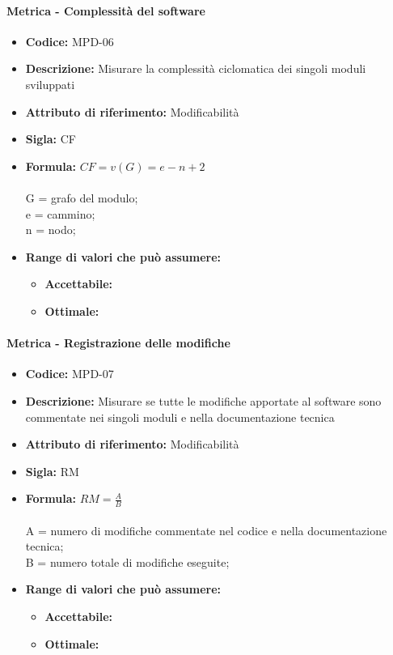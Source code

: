            \paragraph{Metrica - Complessità del software} 
              \begin{itemize}
         \item   \textbf{Codice:} MPD-06
         \item   \textbf{Descrizione:} Misurare la complessità ciclomatica dei singoli moduli sviluppati
          \item  \textbf{Attributo di riferimento:} Modificabilità
          \item  \textbf{Sigla:} CF
         \item   \textbf{Formula:} \begin{math}CF = v(G) = e - n + 2 \end{math}\\ \\
            G = grafo del modulo;\\
            e = cammino;\\
            n = nodo; 
               \item \textbf{Range di valori che può assumere:}
        \begin{itemize}
            \item \textbf{Accettabile:} 
            \item \textbf{Ottimale:} 
        \end{itemize}
       \end{itemize}
              

\paragraph{Metrica - Registrazione delle modifiche} 
   \begin{itemize}
          \item  \textbf{Codice:} MPD-07
         \item   \textbf{Descrizione:} Misurare se tutte le modifiche apportate al software sono commentate nei singoli moduli e nella documentazione tecnica
         \item   \textbf{Attributo di riferimento:} Modificabilità
         \item   \textbf{Sigla:} RM
         \item   \textbf{Formula:} \begin{math}RM = \frac{A}{B}\end{math}\\ \\
            A = numero di modifiche commentate nel codice e nella documentazione tecnica;\\
            B = numero totale di modifiche eseguite;
               \item \textbf{Range di valori che può assumere:}
        \begin{itemize}
            \item \textbf{Accettabile:} 
            \item \textbf{Ottimale:} 
        \end{itemize}
       \end{itemize}
              
